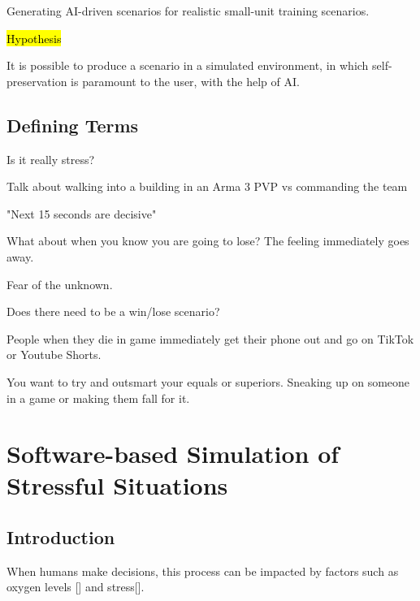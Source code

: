 \documentclass{article}
\begin{document}
Generating AI-driven scenarios for realistic small-unit training scenarios. 

\hl{Hypothesis}

It is possible to produce a scenario in a simulated environment, in which self-preservation is paramount to the user, with the help of AI.


\subsection{Defining Terms}

Is it really stress?

Talk about walking into a building in an Arma 3 PVP vs commanding the team

"Next 15 seconds are decisive"

What about when you know you are going to lose? The feeling immediately goes away. 

Fear of the unknown.

Does there need to be a win/lose scenario? 

People when they die in game immediately get their phone out and go on TikTok or Youtube Shorts.

You want to try and outsmart your equals or superiors. Sneaking up on someone in a game or making them fall for it.

\section{Software-based Simulation of Stressful Situations}

\subsection{Introduction}

When humans make decisions, this process can be impacted by factors such as oxygen levels [] and stress[].



\end{document}

